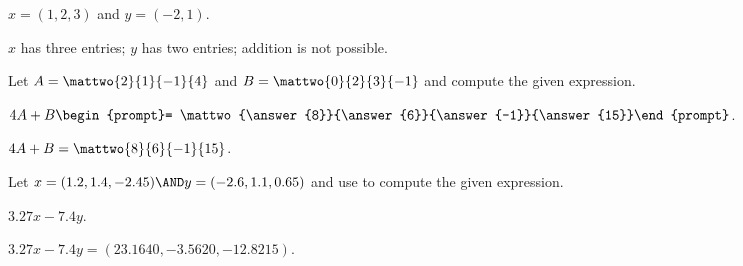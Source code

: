 \documentclass{article}
\begin{document}
\begin{exercise}\label{c1.1.3c}
  $x=(1,2,3)$ and $y=(-2,1)$.
  
  \begin{multipleChoice}
  \end{multipleChoice}  

\begin{solution}
$x$ has three entries; $y$ has two entries; addition is not possible.

\end{solution}
\end{exercise}





\problemlabel

\noindent Let $A=\mattwo{2}{1}{-1}{4}$ and $B=\mattwo{0}{2}{3}{-1}$ and compute the given  expression.

\begin{exercise}\label{c1.1.4A}
  $4A+B\begin{prompt}= \mattwo{\answer{8}}{\answer{6}}{\answer{-1}}{\answer{15}}\end{prompt}$.

\begin{solution}
$4A + B = \mattwo{8}{6}{-1}{15}$.


\end{solution}
\end{exercise}





\matlabproblemlabel

\noindent Let  $x=(1.2,1.4,-2.45) \AND y=(-2.6,1.1,0.65)$ and use \Matlab to compute the  given expression.

\begin{computerExercise}  \label{c1.2.3a}
$3.27x-7.4y$.

\begin{solution}
$3.27x - 7.4y = (23.1640, -3.5620, -12.8215)$.

\end{solution}
\end{computerExercise}


\end{document}

